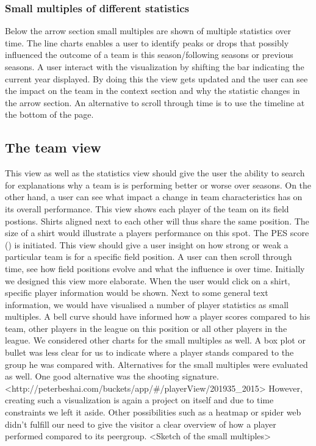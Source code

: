 \documentclass{sigchi}
\begin{document}
\subsubsection{Small multiples of different statistics}
Below the arrow section small multiples are shown of multiple statistics over time. 
The line charts enables a user to identify peaks or drops that possibly influenced the 
outcome of a team is this season/following seasons or previous seasons. A user interact
with the visualization by shifting the bar indicating the current year displayed. By doing
this the view gets updated and the user can see the impact on the team in the context 
section and why the statistic changes in the arrow section. An alternative to scroll
through time is to use the timeline at the bottom of the page.

\subsection{The team view}
This view as well as the statistics view should give the user the ability to search
for explanations why a team is is performing better or worse over seasons. On the 
other hand, a user can see what impact a change in team characteristics has on its
overall performance.
This view shows each player of the team on its field postions. Shirts aligned next to 
each other will thus share the same position. The size of a shirt would illustrate a
players performance on this spot. The PES score () is initiated. This view should give
a user insight on how strong or weak a particular team is for a specific field position.
A user can then scroll through time, see how field positions evolve and what the influence
is over time.
Initially we designed this view more elaborate. When the user would click on a shirt,
specific player information would be shown. Next to some general text information, 
we would have visualised a number of player statistics as small multiples. A bell curve
should have informed how a player scores compared to his team, other players in the 
league on this position or all other players in the league. We considered other charts for
the small multiples as well. A box plot or bullet was less clear for us to indicate where
a player stands compared to the group he was compared with. Alternatives for the small 
multiples were evaluated as well. One good alternative was the shooting signature.
<http://peterbeshai.com/buckets/app/#/playerView/201935_2015>
However, creating such a visualization is again a project on itself and due to time 
constraints we left it aside. Other possibilities such as a heatmap or spider web didn't
fulfill our need to give the visitor a clear overview of how a player performed compared
to its peergroup.
<Sketch of the small multiples>
\end{document}
